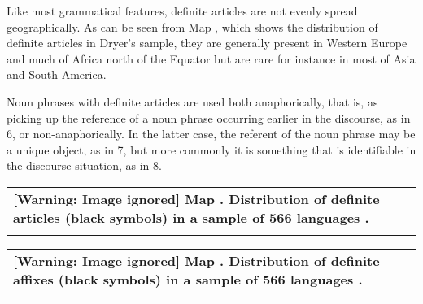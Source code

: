 \begin{styleBodytextC}
Like most grammatical features, definite articles are not evenly spread geographically. As can be seen from Map , which shows the distribution of definite articles in Dryer’s sample, they are generally present in Western Europe and much of Africa north of the Equator but are rare for instance in most of Asia and South America.

\end{styleBodytextC}

\begin{styleBodytextC}
Noun phrases with definite articles are used both anaphorically, that is, as picking up the reference of a noun phrase occurring earlier in the discourse, as in 6, or non-anaphorically. In the latter case, the referent of the noun phrase may be a unique object, as in 7, but more commonly it is something that is identifiable in the discourse situation, as in 8.

\end{styleBodytextC}

\begin{tabular}{l}
\lsptoprule
{\bfseries \label{bkm:Ref130721880}  [Warning: Image ignored] %
 Map . Distribution of definite articles (black symbols) in a sample of 566 languages \citep{Dryer2005}.}\\
\lspbottomrule
\end{tabular}

\begin{tabular}{l}
\lsptoprule
{\bfseries   [Warning: Image ignored] %
 Map . Distribution of definite affixes (black symbols) in a sample of 566 languages \citep{Dryer2005}.}\\
\lspbottomrule
\end{tabular}

